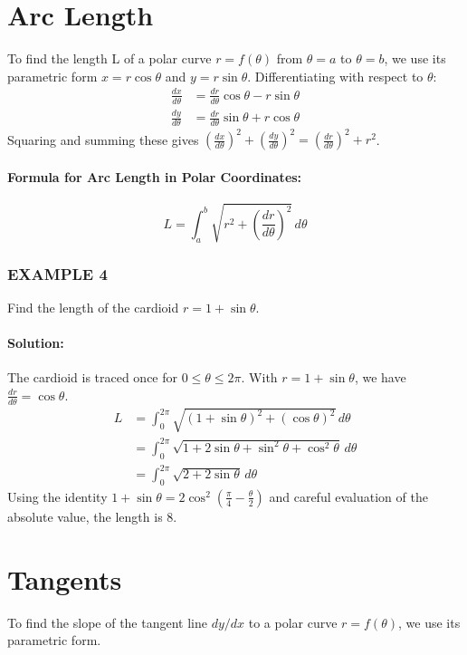 \documentclass{article}
\begin{document}
\section*{Arc Length}
To find the length L of a polar curve $r = f(\theta)$ from $\theta = a$ to $\theta = b$, we use its parametric form $x = r\cos\theta$ and $y = r\sin\theta$. Differentiating with respect to $\theta$:
\begin{align*}
    \frac{dx}{d\theta} &= \frac{dr}{d\theta}\cos\theta - r\sin\theta \\
    \frac{dy}{d\theta} &= \frac{dr}{d\theta}\sin\theta + r\cos\theta
\end{align*}
Squaring and summing these gives $\left(\frac{dx}{d\theta}\right)^2 + \left(\frac{dy}{d\theta}\right)^2 = \left(\frac{dr}{d\theta}\right)^2 + r^2$.

\paragraph{Formula for Arc Length in Polar Coordinates:}
\[
L = \int_{a}^{b} \sqrt{r^2 + \left(\frac{dr}{d\theta}\right)^2} \, d\theta
\]

\subsubsection*{EXAMPLE 4}
Find the length of the cardioid $r = 1 + \sin\theta$.

\paragraph{Solution:} The cardioid is traced once for $0 \le \theta \le 2\pi$. With $r = 1 + \sin\theta$, we have $\frac{dr}{d\theta} = \cos\theta$.
\begin{align*}
    L &= \int_{0}^{2\pi} \sqrt{(1 + \sin\theta)^2 + (\cos\theta)^2} \, d\theta \\
    &= \int_{0}^{2\pi} \sqrt{1 + 2\sin\theta + \sin^2\theta + \cos^2\theta} \, d\theta \\
    &= \int_{0}^{2\pi} \sqrt{2 + 2\sin\theta} \, d\theta
\end{align*}
Using the identity $1+\sin\theta = 2\cos^2(\frac{\pi}{4}-\frac{\theta}{2})$ and careful evaluation of the absolute value, the length is 8.

\section*{Tangents}
To find the slope of the tangent line $dy/dx$ to a polar curve $r = f(\theta)$, we use its parametric form.
\end{document}
